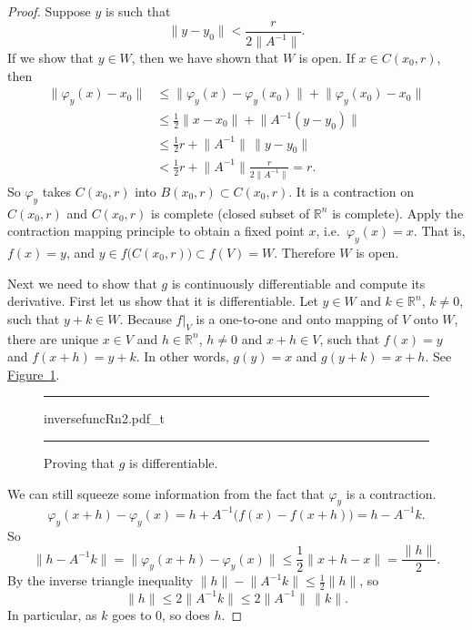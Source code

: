 \documentclass[12pt,openany]{book}
\newcommand{\snorm}[1]{\lVert {#1} \rVert}
\newcommand{\R}{{\mathbb{R}}}
\theoremstyle{plain}
\theoremstyle{remark}
\theoremstyle{definition}
\newenvironment{myfig}{%
\begin{figure}[h!t]
\noindent\rule{\textwidth}{0.4pt}\vspace{12pt}\par\centering}%
{\par\noindent\rule{\textwidth}{0.4pt}
\end{figure}}
\theoremstyle{exercise}
\theoremstyle{example}
\newcommand{\figureref}[1]{\hyperref[#1]{Figure~\ref*{#1}}}
\begin{document}
\begin{proof}
Suppose $y$ is such that
\begin{equation*}
\snorm{y-y_0} <
\frac{r}{2\snorm{A^{-1}}} .
\end{equation*}
If we show that $y \in W$, then we have shown that $W$ is open.
If $x \in
C(x_0,r)$, then
\begin{equation*}
\begin{split}
\snorm{\varphi_y(x)-x_0}
& \leq
\snorm{\varphi_y(x)-\varphi_y(x_0)} +
\snorm{\varphi_y(x_0)-x_0} \\
& \leq
\frac{1}{2}\snorm{x-x_0} +
\snorm{A^{-1}(y-y_0)} \\
& \leq
\frac{1}{2}r +
\snorm{A^{-1}} \, \snorm{y-y_0} \\
& <
\frac{1}{2}r +
\snorm{A^{-1}}
\frac{r}{2\snorm{A^{-1}}} = r .
\end{split}
\end{equation*}
So $\varphi_y$ takes $C(x_0,r)$ into $B(x_0,r) \subset C(x_0,r)$.  It is a
contraction on $C(x_0,r)$ and $C(x_0,r)$ is complete (closed subset of $\R^n$
is complete).
Apply the contraction mapping principle to obtain a fixed point $x$,
i.e.\ $\varphi_y(x) = x$.  That is, $f(x) = y$, and $y \in
f\bigl(C(x_0,r)\bigr) \subset f(V) = W$.  Therefore $W$ is open.

Next we need to show that $g$ is continuously differentiable and compute
its derivative.  First let us show that it is differentiable.
Let $y \in W$ and $k \in \R^n$, $k\not= 0$, such that $y+k \in W$.
Because $f|_V$ is a one-to-one and onto mapping of $V$ onto $W$,
there are unique
$x \in V$ and $h \in \R^n$, $h \not= 0$ and $x+h \in V$, such that
$f(x) = y$ and $f(x+h) = y+k$.
In other words, $g(y) = x$ and $g(y+k) = x+h$.  See
\figureref{fig:inversefuncRn2}.
\begin{myfig}
{inversefuncRn2.pdf_t}
\caption{Proving that $g$ is differentiable.\label{fig:inversefuncRn2}}
\end{myfig}

We can still
squeeze some information from the fact that $\varphi_y$ is a contraction.
\begin{equation*}
\varphi_y(x+h)-\varphi_y(x) = h + A^{-1} \bigl( f(x)-f(x+h) \bigr) = h - A^{-1} k .
\end{equation*}
So
\begin{equation*}
\snorm{h-A^{-1}k} = \snorm{\varphi_y(x+h)-\varphi_y(x)} \leq
\frac{1}{2}\snorm{x+h-x} = \frac{\snorm{h}}{2}.
\end{equation*}
By the inverse triangle inequality $\snorm{h} - \snorm{A^{-1}k} \leq
\frac{1}{2}\snorm{h}$, so
\begin{equation*}
\snorm{h} \leq 2 \snorm{A^{-1}k} \leq 2 \snorm{A^{-1}} \, \snorm{k}.
\end{equation*}
In particular, as $k$ goes to $0$, so does $h$.


\end{proof}
\end{document}
